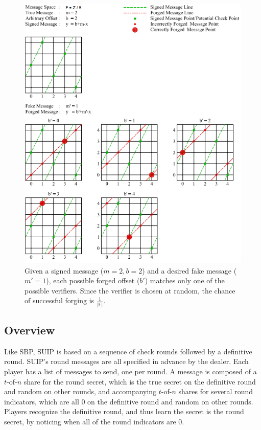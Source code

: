 \documentclass[12pt]{dalcsthesis}
\begin{document}
\begin{figure}
\includegraphics[width=\textwidth]{../../Graphics/PointAndLineExample.png}
\caption[Difficulty of forging a message]{Given a signed message ($m=2, b=2$) and a desired fake message ($m'=1$), each possible forged offset ($b'$) matches only one of the possible verifiers. Since the verifier is chosen at random, the chance of successful forging is $\frac{1}{|\mathbb{F}|}$.}
\label{img:ForgingVerifiableMessageForUnbounded}
\end{figure}

\subsection{Overview}

Like SBP, SUIP is based on a sequence of check rounds followed by a definitive round. SUIP's round messages are all specified in advance by the dealer. Each player has a list of messages to send, one per round. A message is composed of a $t$-of-$n$ share for the round secret, which is the true secret on the definitive round and random on other rounds, and accompanying $t$-of-$n$ shares for several round indicators, which are all 0 on the definitive round and random on other rounds. Players recognize the definitive round, and thus learn the secret is the round secret, by noticing when all of the round indicators are 0.
\end{document}
